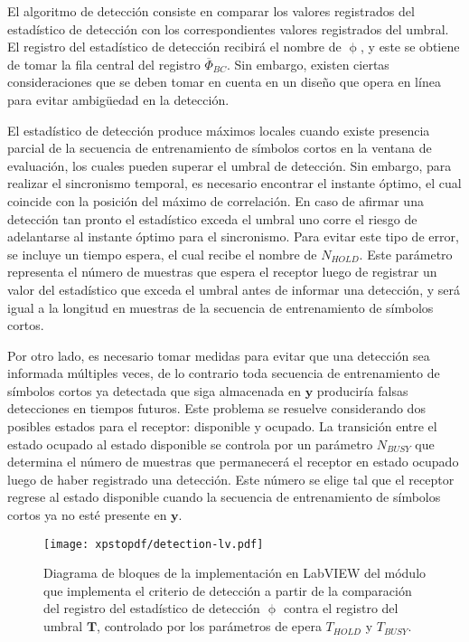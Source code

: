 El algoritmo de detección consiste en comparar los valores registrados del estadístico de detección con los correspondientes valores registrados del umbral. El registro del estadístico de detección recibirá el nombre de $\upphi$, y este se obtiene de tomar la fila central del registro $\overline{\Phi}_{BC}$. Sin embargo, existen ciertas consideraciones que se deben \color{Red} tomar en cuenta en un diseño que opera en línea \color{black} para evitar ambigüedad en la detección.

El estadístico de detección produce máximos locales cuando existe presencia parcial de la secuencia de entrenamiento de símbolos cortos en la ventana de evaluación, los cuales pueden superar el umbral de detección. Sin embargo, para realizar el sincronismo temporal, es necesario encontrar el instante óptimo, el cual coincide con la posición del máximo de correlación. En caso de afirmar una detección tan pronto el estadístico exceda el umbral uno corre el riesgo de adelantarse al instante óptimo para el sincronismo. Para evitar este tipo de error, se incluye un tiempo espera, el cual recibe el nombre de $N_{HOLD}$. Este parámetro representa el número de muestras que espera el receptor luego de registrar un valor del estadístico que exceda el umbral antes de informar una detección, y será igual a la longitud en muestras de la secuencia de entrenamiento de símbolos cortos.

Por otro lado, es necesario tomar medidas para evitar que una detección sea informada múltiples veces, de lo contrario toda secuencia de entrenamiento de símbolos cortos ya detectada que siga almacenada en $\mathbf{y}$ produciría falsas detecciones en tiempos futuros. Este problema se resuelve considerando dos posibles estados para el receptor: disponible y ocupado. La transición entre el estado ocupado al estado disponible se controla por un parámetro $N_{BUSY}$ que determina el número de muestras que permanecerá el receptor en estado ocupado luego de haber registrado una detección. Este número se elige tal que el receptor regrese al estado disponible cuando la secuencia de entrenamiento de símbolos cortos ya no esté presente en $\mathbf{y}$.

\begin{figure}[t]
    \centering{}\texttt{[image: xpstopdf/detection-lv.pdf]}
    \caption[implementación en LabVIEW del criterio de detección a partir de los registros de un estadístico y un umbral.]{Diagrama de bloques de la implementación en LabVIEW del módulo que implementa el criterio de detección a partir de la comparación del registro del estadístico de detección $\upphi$ contra el registro del umbral $\mathbf{T}$, controlado por los parámetros de epera $T_{HOLD}$ y $T_{BUSY}$.\label{fig:detection-lv}}  
\end{figure}

